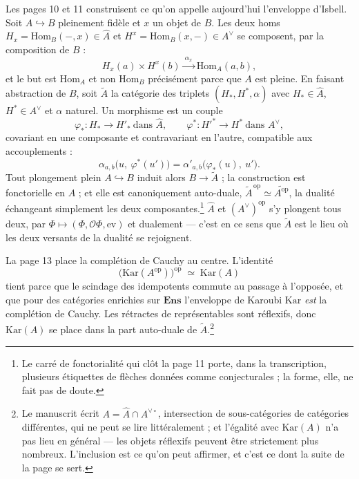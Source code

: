 \documentclass[11pt,a4paper]{article}
\begin{document}
Les pages 10 et 11 construisent ce qu'on appelle aujourd'hui l'enveloppe
d'Isbell. Soit $A \hookrightarrow B$ pleinement fidèle et $x$ un objet de $B$.
Les deux homs $H_{x} = \mathrm{Hom}_{B}(-, x) \in \widehat{A}$ et $H^{x} =
\mathrm{Hom}_{B}(x, -) \in A^{\vee}$ se composent, par la composition de $B$ :
\[
H_{x}(a) \times H^{x}(b) \xrightarrow{\ \alpha_{x}\ } \mathrm{Hom}_{A}(a,b),
\]
et le but est $\mathrm{Hom}_{A}$ et non $\mathrm{Hom}_{B}$ précisément parce
que $A$ est pleine. En faisant abstraction de $B$, soit $\widetilde{A}$ la
catégorie des triplets $(H_{*}, H^{*}, \alpha)$ avec $H_{*} \in \widehat{A}$,
$H^{*} \in A^{\vee}$ et $\alpha$ naturel. Un morphisme est un couple
\[
\varphi_{*} : H_{*} \to H'_{*} \ \text{dans } \widehat{A},
\qquad
\varphi^{*} : H'^{*} \to H^{*} \ \text{dans } A^{\vee},
\]
covariant en une composante et contravariant en l'autre, compatible aux
accouplements :
\[
\alpha_{a,b}\bigl(u,\ \varphi^{*}(u')\bigr)
= \alpha'_{a,b}\bigl(\varphi_{*}(u),\ u'\bigr).
\]
Tout plongement plein $A \hookrightarrow B$ induit alors $B \to \widetilde{A}$ ;
la construction est fonctorielle en $A$ ; et elle est canoniquement auto-duale,
$\widetilde{A}^{\,\mathrm{op}} \simeq \widetilde{A^{\mathrm{op}}}$, la dualité
échangeant simplement les deux composantes.\footnote{Le carré de fonctorialité
qui clôt la page 11 porte, dans la transcription, plusieurs étiquettes de
flèches données comme conjecturales ; la forme, elle, ne fait pas de doute.}
$\widehat{A}$ et $(A^{\vee})^{\mathrm{op}}$ s'y plongent tous deux, par
$\Phi \mapsto (\Phi, \mathcal{O}\Phi, \mathrm{ev})$ et dualement — c'est en
ce sens que $\widetilde{A}$ est le lieu où les deux versants de la dualité se
rejoignent.

La page 13 place la complétion de Cauchy au centre. L'identité
\[
\bigl(\mathrm{Kar}(A^{\mathrm{op}})\bigr)^{\mathrm{op}} \;\simeq\; \mathrm{Kar}(A)
\]
tient parce que le scindage des idempotents commute au passage à l'opposée, et
que pour des catégories enrichies sur $\mathbf{Ens}$ l'enveloppe de Karoubi
$\mathrm{Kar}$ \emph{est} la complétion de Cauchy. Les rétractes de
représentables sont réflexifs, donc $\mathrm{Kar}(A)$ se place dans la part
auto-duale de $\widetilde{A}$.\footnote{Le manuscrit écrit $A = \widehat{A}
\cap A^{\vee\circ}$, intersection de sous-catégories de catégories
différentes, qui ne peut se lire littéralement ; et l'égalité avec
$\mathrm{Kar}(A)$ n'a pas lieu en général — les objets réflexifs peuvent être
strictement plus nombreux. L'inclusion est ce qu'on peut affirmer, et c'est ce
dont la suite de la page se sert.}
\end{document}
